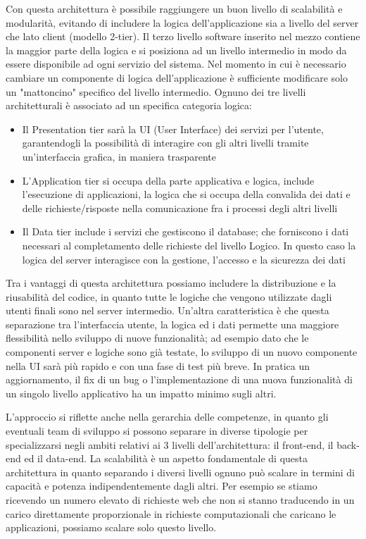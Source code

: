 Con questa architettura è possibile raggiungere un buon livello di scalabilità
e modularità, evitando di includere la logica dell’applicazione sia a livello del
server che lato client (modello 2-tier).
Il terzo livello software inserito nel mezzo contiene la maggior parte della logica
e si posiziona ad un livello intermedio in modo da essere disponibile ad ogni
servizio del sistema. Nel momento in cui è necessario cambiare un componente di
logica dell’applicazione è sufficiente modificare solo un "mattoncino" specifico del
livello intermedio.
Ognuno dei tre livelli architetturali è associato ad un specifica categoria logica:
\begin{itemize}
	\item Il Presentation tier sarà la UI (User Interface) dei servizi per l’utente,
	garantendogli la possibilità di interagire con gli altri livelli tramite
	un'interfaccia grafica, in maniera trasparente
	\item L'Application tier si occupa della parte applicativa e logica,
	include l’esecuzione di applicazioni, la logica che si occupa della convalida
	dei dati e delle richieste/risposte nella comunicazione fra i processi degli
	altri livelli
	\item Il Data tier include i servizi che gestiscono il database; che forniscono
	i dati necessari al completamento delle richieste del livello Logico. In questo
	caso la logica del server interagisce con la gestione, l’accesso e la sicurezza
	dei dati
\end{itemize}
Tra i vantaggi di questa architettura possiamo includere la distribuzione e la
riusabilità del codice, in quanto tutte le logiche che vengono utilizzate dagli
utenti finali sono nel server intermedio. Un'altra caratteristica è che questa
separazione tra l'interfaccia utente, la logica ed i dati permette una maggiore
flessibilità nello sviluppo di nuove funzionalità; ad esempio dato che le
componenti server e logiche sono già testate, lo sviluppo di un nuovo componente
nella UI sarà più rapido e con una fase di test più breve. In pratica un
aggiornamento, il fix di un bug o l'implementazione di una nuova funzionalità di
un singolo livello applicativo ha un impatto minimo sugli altri.

L'approccio si riflette anche nella gerarchia delle competenze, in quanto gli
eventuali team di sviluppo si possono separare in diverse tipologie per
specializzarsi negli ambiti relativi ai 3 livelli dell'architettura: il front-end,
il back-end ed il data-end. La scalabilità è un aspetto fondamentale di questa
architettura in quanto separando i diversi livelli ognuno può scalare in termini
di capacità e potenza indipendentemente dagli altri. Per esempio se stiamo ricevendo
un numero elevato di richieste web che non si stanno traducendo in un carico
direttamente proporzionale in richieste computazionali che caricano le applicazioni,
possiamo scalare solo questo livello.

